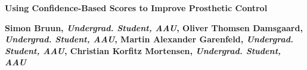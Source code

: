 
%

\begin{center}	
	{\huge\textbf{Using Confidence-Based Scores to Improve Prosthetic Control}}
	
	
	{\large \textbf{Simon Bruun, \textit{Undergrad. Student, AAU}, Oliver Thomsen Damsgaard, \textit{Undergrad. Student, AAU}, Martin Alexander Garenfeld, \textit{Undergrad. Student, AAU}, Christian Korfitz Mortensen, \textit{Undergrad. Student, AAU}}}
\end{center}

